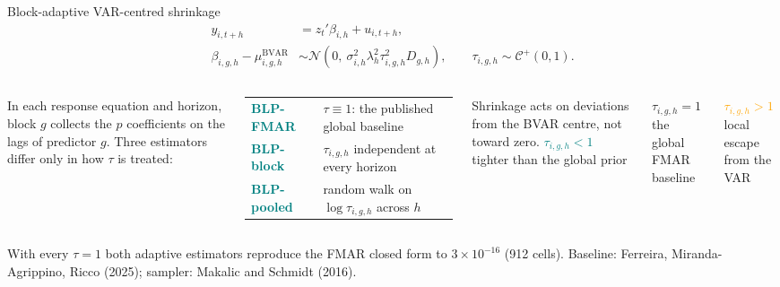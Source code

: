 \documentclass[aspectratio=169,11pt]{beamer}
\newcommand{\keypoint}[1]{\textcolor{Teal}{\textbf{#1}}}
\newcommand{\warning}[1]{\textcolor{Orange}{\textbf{#1}}}
\newcommand{\smallsource}[1]{%
  \par\vfill{\fontsize{7}{8.4}\selectfont\color{MidGray}#1}%
}
\begin{document}
\begin{frame}{Block-adaptive VAR-centred shrinkage}
  \vspace{-3mm}
  {\fontsize{11}{13.5}\selectfont
  \begin{align*}
    y_{i,t+h} &= z_t'\beta_{i,h}+u_{i,t+h},\\[-1mm]
    \beta_{i,g,h}-\mu^{\mathrm{BVAR}}_{i,g,h}
      &\sim \mathcal N\!\left(0,\ \sigma^2_{i,h}\lambda_h^2\tau_{i,g,h}^2D_{g,h}\right),
      \qquad \tau_{i,g,h}\sim\mathcal C^+(0,1).
  \end{align*}}
  \vspace{-4mm}
  \begin{columns}[T,onlytextwidth]
      In each response equation and horizon, block $g$ collects the $p$
      coefficients on the lags of predictor $g$. Three estimators differ
      only in how $\tau$ is treated:\par
      \vspace{1.5mm}
      \begin{tabular}{@{}ll@{}}
        \keypoint{BLP-FMAR} & $\tau\equiv1$: the published global baseline\\
        \keypoint{BLP-block} & $\tau_{i,g,h}$ independent at every horizon\\
        \keypoint{BLP-pooled} & random walk on $\log\tau_{i,g,h}$ across $h$\\
      \end{tabular}\par
      \vspace{1mm}
      Shrinkage acts on deviations from the BVAR centre, not toward zero.
      \keypoint{$\tau_{i,g,h}<1$}\; tighter than the global prior\par
      \vspace{1mm}
      \textbf{$\tau_{i,g,h}=1$}\; the global FMAR baseline\par
      \vspace{1mm}
      \warning{$\tau_{i,g,h}>1$}\; local escape from the VAR
  \end{columns}
  \smallsource{With every $\tau=1$ both adaptive estimators reproduce the FMAR closed form to $3\times10^{-16}$ (912 cells). Baseline: Ferreira, Miranda-Agrippino, Ricco (2025); sampler: Makalic and Schmidt (2016).}
\end{frame}
\end{document}
